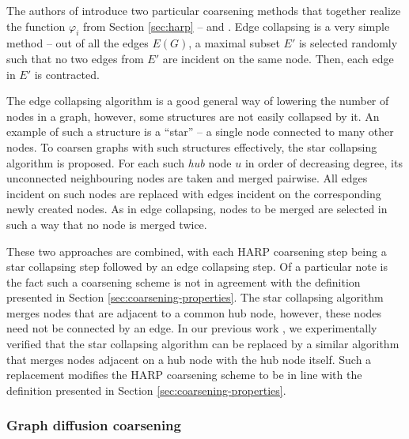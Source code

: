 The authors of \cite{chen_harp_2018} introduce two particular coarsening methods that together realize the function \( \varphi_i \) from Section \ref{sec:harp} --  and . Edge collapsing is a very simple method -- out of all the edges \( E \left( G \right) \), a maximal subset \( E' \) is selected randomly such that no two edges from \( E' \) are incident on the same node. Then, each edge in \( E' \) is contracted.

The edge collapsing algorithm is a good general way of lowering the number of nodes in a graph, however, some structures are not easily collapsed by it. An example of such a structure is a \enquote{star} -- a single node connected to many other nodes. To coarsen graphs with such structures effectively, the star collapsing algorithm is proposed. For each such \textit{hub} node \( u \) in order of decreasing degree, its unconnected neighbouring nodes are taken and merged pairwise. All edges incident on such nodes are replaced with edges incident on the corresponding newly created nodes. As in edge collapsing, nodes to be merged are selected in such a way that no node is merged twice.

These two approaches are combined, with each HARP coarsening step being a star collapsing step followed by an edge collapsing step. Of a particular note is the fact such a coarsening scheme is not in agreement with the definition presented in Section \ref{sec:coarsening-properties}. The star collapsing algorithm merges nodes that are adjacent to a common hub node, however, these nodes need not be connected by an edge. In our previous work \cite{dedic_graph_2021}, we experimentally verified that the star collapsing algorithm can be replaced by a similar algorithm that merges nodes adjacent on a hub node with the hub node itself. Such a replacement modifies the HARP coarsening scheme to be in line with the definition presented in Section \ref{sec:coarsening-properties}.

\subsubsection{Graph diffusion coarsening}\label{sec:gdc-coarsening}


